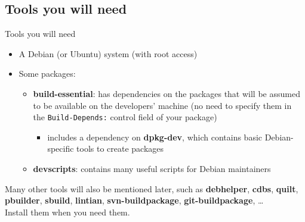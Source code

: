 \documentclass[10pt,final]{beamer}
\begin{document}
\subsection{Tools you will need}
\begin{frame}{Tools you will need}
	\begin{itemize}
		\item A Debian (or Ubuntu) system (with root access)
			\br
		\item Some packages:
	\begin{itemize}
		\item \textbf{build-essential}: has dependencies on the packages that will be assumed to be available on the developers' machine (no need to specify them in the \texttt{Build-Depends:} control field of your package)
		\begin{itemize}
			\item includes a dependency on \textbf{dpkg-dev}, which contains basic Debian-specific tools to create packages
		\end{itemize}
		\hbr
	\item \textbf{devscripts}: contains many useful scripts for Debian maintainers
	\end{itemize}
	\end{itemize}

	\br
	Many other tools will also be mentioned later, such as \textbf{debhelper}, \textbf{cdbs}, \textbf{quilt}, \textbf{pbuilder}, \textbf{sbuild}, \textbf{lintian}, \textbf{svn-buildpackage}, \textbf{git-buildpackage}, \ldots\\
	Install them when you need them.
\end{frame}
\end{document}
